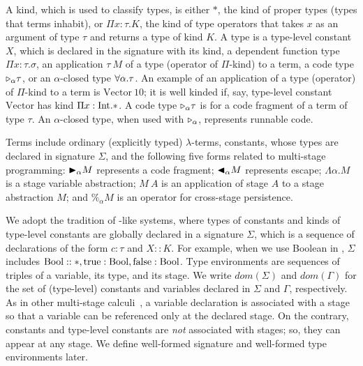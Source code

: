 


A kind, which is used to classify types, is either $*$, the kind of
proper types (types that terms inhabit), or $\Pi x\colon\tau.K$, the kind
of type operators that takes $x$ as an argument of type $\tau$ and returns a type
of kind $K$.
A type is a type-level constant $X$, which is declared in the signature with its kind, a dependent function type $\Pi x:\tau.\sigma$,
an application $\tau\ M$ of a type (operator of $\Pi$-kind) to a term, a code type ${\mathop{\triangleright}}_\alpha \tau$, or an $\alpha$-closed type $\forall\alpha.\tau$.
An example of an application of a type (operator) of $\Pi$-kind to a term is $\text{Vector}\ 10$; it is well kinded
if, say, type-level constant $\text{Vector}$ has kind $\Pi x:\textrm{Int}.*$.
A code type ${\mathop{\triangleright}}_\alpha \tau$ is for a code fragment of a term of type $\tau$.
An $\alpha$-closed type, when used with ${\mathop{\triangleright}}_\alpha$, represents runnable code.



Terms include ordinary (explicitly typed) \(\lambda\)-terms, constants,
whose types are declared in signature $\Sigma$, and the following five forms
related to multi-stage programming:
${\mathop{\blacktriangleright}}_\alpha M$ represents a code fragment; ${\mathop{\blacktriangleleft}}_\alpha M$ represents escape;
$\Lambda\alpha.M$ is a stage variable abstraction;
$M\ A$ is an application of stage $A$ to a stage abstraction $M$; and
$\%_\alpha M$ is an operator for cross-stage persistence.


We adopt the tradition of \LLF-like systems, where types of constants and kinds of type-level constants are globally declared in a signature $\Sigma$, which
is a sequence of declarations of the form $c:\tau$ and $X::K$.
For example, when we use Boolean in \LMD, $\Sigma$ includes $\textrm{Bool} :: *, \textrm{true}:\textrm{Bool}, \textrm{false}:\textrm{Bool}$.
Type environments are sequences of triples of a variable, its type, and its stage.
We write \(\textit{dom}(\Sigma)\) and \(\textit{dom}(\Gamma)\)
for the set of (type-level) constants and variables declared in \(\Sigma\) and \(\Gamma\), respectively.   As in other multi-stage calculi~\cite{taha2003environment,Tsukada,Hanada2014},
a variable declaration is associated with a stage
so that a variable can be referenced only at the declared stage.
On the contrary, constants and type-level constants are \emph{not} associated with stages;
so, they can appear at any stage.
We define well-formed signature and well-formed type environments later.

